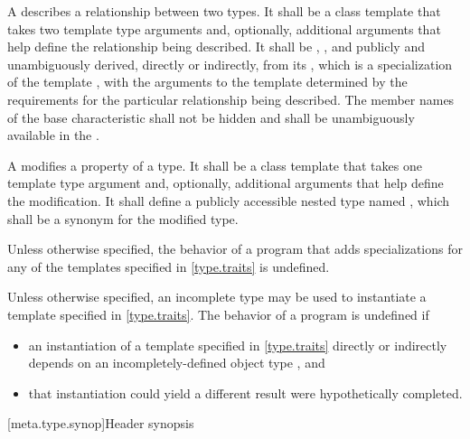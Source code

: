 \pnum
A  describes a
relationship between two types. It shall be a class template that
takes two template type arguments and, optionally, additional
arguments that help define the relationship being described. It shall
be , ,
and publicly and unambiguously derived, directly or
indirectly, from
its , which is a specialization
of the template
, with
the arguments to the template  determined by the
requirements for the particular relationship being described.
The member names of the base characteristic shall not be hidden and shall be
unambiguously available in the .

\pnum
A 
modifies a property
of a type. It shall be a class template that takes one
template type argument and, optionally, additional arguments that help
define the modification. It shall define a publicly accessible nested type
named , which shall be a synonym for the modified type.

\pnum
Unless otherwise specified,
the behavior of a program that adds specializations
for any of the templates specified in \ref{type.traits}
is undefined.

\pnum
Unless otherwise specified, an incomplete type may be used
to instantiate a template specified in \ref{type.traits}.
The behavior of a program is undefined if
\begin{itemize}
\item
  an instantiation of a template specified in \ref{type.traits}
  directly or indirectly depends on
  an incompletely-defined object type , and
\item
  that instantiation could yield a different result
  were  hypothetically completed.
\end{itemize}

[meta.type.synop]{Header  synopsis}

